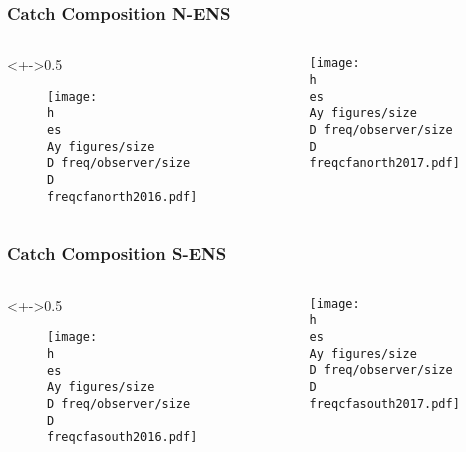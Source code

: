 \documentclass{beamer}
\newcommand{\D}{.} %
\newcommand{\h}{C:/} %
\newcommand{\es}{bio.data/bio.snowcrab/}
\newcommand{\Ay}{assessments/2017/}
\begin{document}
\begin{frame}
\frametitle{Catch Composition N-ENS}

\begin{columns}
\begin{column}<+->{0.5\textwidth}
 \vspace*{-0.5cm}
\begin{figure}
\centerline{\texttt{[image: \\h \\es \\Ay figures/size\\D freq/observer/size\\D freqcfanorth2016.pdf]}}

\end{figure}
\end{column}

\begin{column}{0.5\textwidth}
\begin{figure}
 \vspace*{-0.5cm}

	\centerline{\texttt{[image: \\h \\es \\Ay figures/size\\D freq/observer/size\\D freqcfanorth2017.pdf]}}

 \end{figure}
\end{column}
\end{columns}
\end{frame}


\begin{frame}
\frametitle{Catch Composition S-ENS}

\begin{columns}
\begin{column}<+->{0.5\textwidth}
 \vspace*{-0.5cm}
\begin{figure}
\centerline{\texttt{[image: \\h \\es \\Ay figures/size\\D freq/observer/size\\D freqcfasouth2016.pdf]}}

\end{figure}
\end{column}

\begin{column}{0.5\textwidth}
\begin{figure}
 \vspace*{-0.5cm}

\centerline{\texttt{[image: \\h \\es \\Ay figures/size\\D freq/observer/size\\D freqcfasouth2017.pdf]}}

 \end{figure}

\end{column}
\end{columns}


\end{frame}
\end{document}
